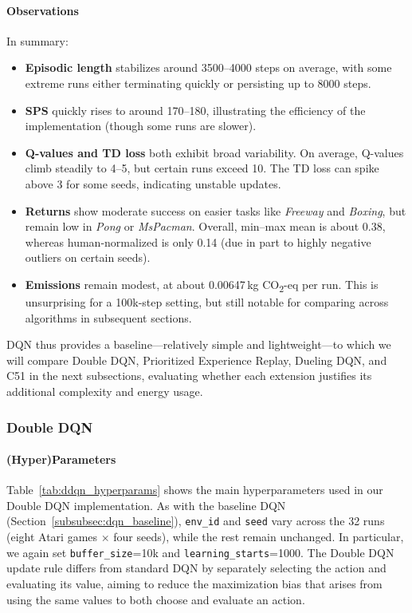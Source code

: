 \paragraph{Observations}
In summary:
\begin{itemize}
	\item \textbf{Episodic length} stabilizes around 3500--4000 steps on average, 
	with some extreme runs either terminating quickly or persisting up to 8000 steps.
	\item \textbf{SPS} quickly rises to around 170--180, illustrating the efficiency 
	of the implementation (though some runs are slower).
	\item \textbf{Q-values and TD loss} both exhibit broad variability. On average, 
	Q-values climb steadily to 4--5, but certain runs exceed 10. The TD loss 
	can spike above 3 for some seeds, indicating unstable updates.
	\item \textbf{Returns} show moderate success on easier tasks like \textit{Freeway} 
	and \textit{Boxing}, but remain low in \textit{Pong} or \textit{MsPacman}. Overall, 
	min--max mean is about 0.38, whereas human-normalized is only 0.14 (due in part 
	to highly negative outliers on certain seeds).
	\item \textbf{Emissions} remain modest, at about 0.00647\,kg CO\textsubscript{2}-eq 
	per run. This is unsurprising for a 100k-step setting, but still notable for 
	comparing across algorithms in subsequent sections.
\end{itemize}

DQN thus provides a baseline—relatively simple and lightweight—to which we will 
compare Double DQN, Prioritized Experience Replay, Dueling DQN, and C51 
in the next subsections, evaluating whether each extension justifies 
its additional complexity and energy usage.


\subsubsection{Double DQN}
\label{subsubsec:double_dqn}

\paragraph{(Hyper)Parameters}
Table~\ref{tab:ddqn_hyperparams} shows the main hyperparameters used in our Double DQN implementation.  
As with the baseline DQN (Section~\ref{subsubsec:dqn_baseline}), \texttt{env\_id} and \texttt{seed} vary across the 32 runs (eight Atari games $\times$ four seeds), while the rest remain unchanged. In particular, we again set \texttt{buffer\_size}=10k and \texttt{learning\_starts}=1000. 
The Double DQN update rule differs from standard DQN by separately selecting the action and evaluating its value, aiming to reduce the maximization bias that arises from using the same values to both choose and evaluate an action.

